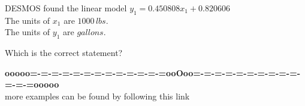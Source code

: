 \documentclass{ximera}
\begin{document}
\begin{question}


DESMOS found the linear model $y_1 = 0.450808 x_1 + 0.820606$ \\


The units of $x_1$ are $1000 \, lbs$. \\
The units of $y_1$ are $gallons$.



Which is the correct statement?

\begin{multipleChoice}
\end{multipleChoice}


\end{question}




















\begin{center}
\textbf{\textcolor{green!50!black}{ooooo=-=-=-=-=-=-=-=-=-=-=-=-=ooOoo=-=-=-=-=-=-=-=-=-=-=-=-=ooooo}} \\

more examples can be found by following this link\\ 

\end{center}
\end{document}
